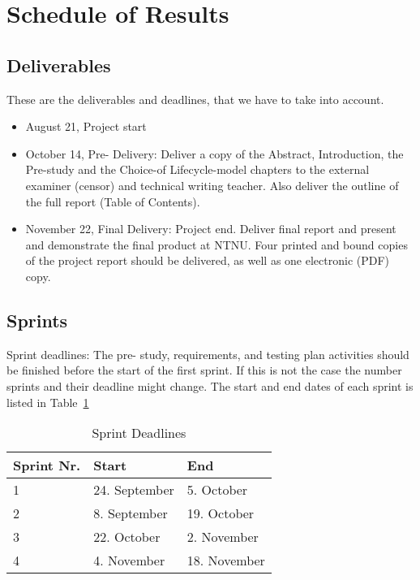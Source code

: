 \section{Schedule of Results}
\subsection {Deliverables}
These are the deliverables and deadlines, that we have to take into account.
\begin {itemize}

\item August 21, Project start

\item October 14, Pre- Delivery: Deliver a copy of the Abstract, Introduction, the Pre-study and the Choice-of Lifecycle-model chapters to the external examiner (censor) and technical writing teacher. Also deliver the outline of the full report (Table of  Contents).

\item November 22, Final Delivery: Project end. Deliver final report and present and demonstrate the final product at NTNU. Four printed and bound copies of  the project report should be delivered, as well as one electronic (PDF) copy.

\end {itemize}

\subsection {Sprints}

Sprint deadlines:
The pre- study, requirements, and testing plan activities should be finished before the start of the first sprint. If this is not the case the number sprints and their deadline might change. The start and end dates of each sprint is listed in Table~\ref{table:sprintdeadlines}

\begin{table}
\caption{Sprint Deadlines}
\centering
\begin{tabular}{ l l l }
\hline
Sprint Nr.		&Start		&End		\\
\hline
1		&24. September		&5. October		\\
2		&8. September			&19. October		\\
3		&22. October			&2. November		\\
4		&4. November			&18. November	\\
\hline
\end{tabular}
\label{table:sprintdeadlines}
\end{table}
